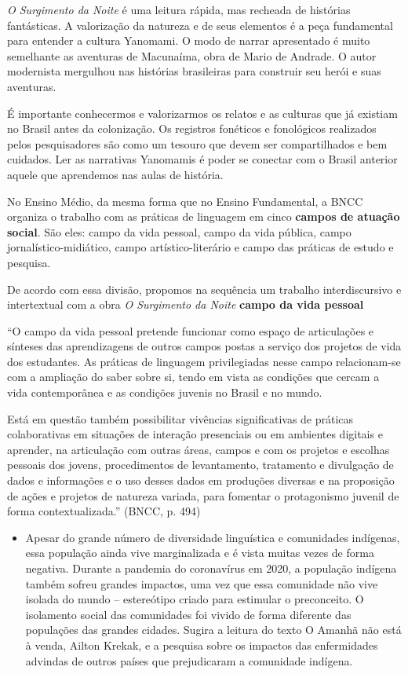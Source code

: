 \documentclass[12pt]{extarticle}
\begin{document}
\emph{O Surgimento da Noite} é uma leitura rápida, mas recheada de
histórias fantásticas. A valorização da natureza e de seus elementos é a
peça fundamental para entender a cultura Yanomami. O modo de narrar
apresentado é muito semelhante as aventuras de Macunaíma, obra de Mario
de Andrade. O autor modernista mergulhou nas histórias brasileiras para
construir seu herói e suas aventuras.

É importante conhecermos e valorizarmos os relatos e as culturas que já
existiam no Brasil antes da colonização. Os registros fonéticos e
fonológicos realizados pelos pesquisadores são como um tesouro que devem
ser compartilhados e bem cuidados. Ler as narrativas Yanomamis é poder
se conectar com o Brasil anterior aquele que aprendemos nas aulas de
história.


No Ensino Médio, da mesma forma que no Ensino Fundamental, a BNCC
organiza o trabalho com as práticas de linguagem em cinco \textbf{campos
de atuação social}. São eles: campo da vida pessoal, campo da vida
pública, campo jornalístico-midiático, campo artístico-literário e campo
das práticas de estudo e pesquisa.

De acordo com essa divisão, propomos na sequência um trabalho
interdiscursivo e intertextual com a obra \emph{O Surgimento da Noite} \textbf{campo da vida pessoal}

``O campo da vida pessoal pretende funcionar como espaço de articulações
e sínteses das aprendizagens de outros campos postas a serviço dos
projetos de vida dos estudantes. As práticas de linguagem privilegiadas
nesse campo relacionam-se com a ampliação do saber sobre si, tendo em
vista as condições que cercam a vida contemporânea e as condições
juvenis no Brasil e no mundo.

Está em questão também possibilitar vivências significativas de práticas
colaborativas em situações de interação presenciais ou em ambientes
digitais e aprender, na articulação com outras áreas, campos e com os
projetos e escolhas pessoais dos jovens, procedimentos de levantamento,
tratamento e divulgação de dados e informações e o uso desses dados em
produções diversas e na proposição de ações e projetos de natureza
variada, para fomentar o protagonismo juvenil de forma
contextualizada.'' (BNCC, p. 494)

\begin{itemize}
\item
  Apesar do grande número de diversidade linguística e comunidades
  indígenas, essa população ainda vive marginalizada e é vista muitas
  vezes de forma negativa. Durante a pandemia do coronavírus em 2020, a
  população indígena também sofreu grandes impactos, uma vez que essa
  comunidade não vive isolada do mundo -- estereótipo criado para
  estimular o preconceito. O isolamento social das comunidades foi
  vivido de forma diferente das populações das grandes cidades. Sugira a
  leitura do texto O Amanhã não está à venda, Ailton Krekak, e a
  pesquisa sobre os impactos das enfermidades advindas de outros países
  que prejudicaram a comunidade indígena.
\end{itemize}
\end{document}
